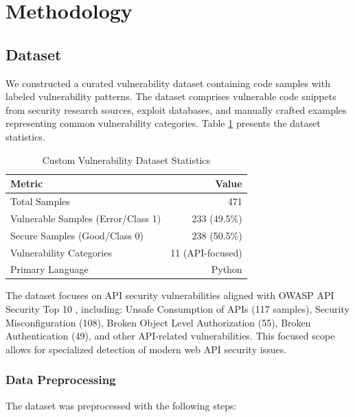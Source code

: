 \documentclass[conference]{IEEEtran}
\begin{document}
\section{Methodology}

\subsection{Dataset}

We constructed a curated vulnerability dataset containing code samples with labeled vulnerability patterns. The dataset comprises vulnerable code snippets from security research sources, exploit databases, and manually crafted examples representing common vulnerability categories. Table \ref{tab:dataset} presents the dataset statistics.

\begin{table}[h]
\centering
\caption{Custom Vulnerability Dataset Statistics}
\label{tab:dataset}
\begin{tabular}{@{}lr@{}}
\toprule
\textbf{Metric} & \textbf{Value} \\ \midrule
Total Samples & 471 \\
Vulnerable Samples (Error/Class 1) & 233 (49.5\%) \\
Secure Samples (Good/Class 0) & 238 (50.5\%) \\
Vulnerability Categories & 11 (API-focused) \\
Primary Language & Python \\ \bottomrule
\end{tabular}
\end{table}

The dataset focuses on API security vulnerabilities aligned with OWASP API Security Top 10 \cite{owasp2023}, including: Unsafe Consumption of APIs (117 samples), Security Misconfiguration (108), Broken Object Level Authorization (55), Broken Authentication (49), and other API-related vulnerabilities. This focused scope allows for specialized detection of modern web API security issues.

\subsubsection{Data Preprocessing}

The dataset was preprocessed with the following steps:
\end{document}
